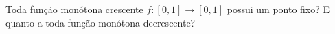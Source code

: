 Toda função monótona crescente \(f \colon  [0,1] \to [0,1]\) possui um ponto fixo? E quanto a toda função monótona decrescente?
